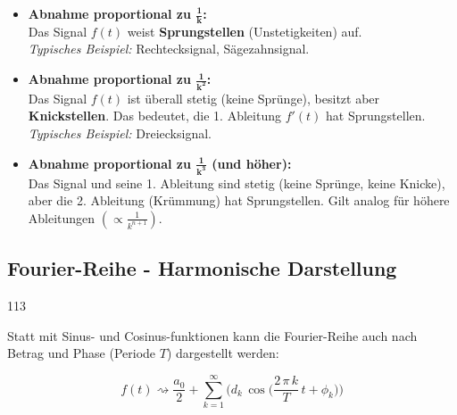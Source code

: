 \begin{itemize}
    \item \textbf{Abnahme proportional zu $\bm{\frac{1}{k}}$:} \\
    Das Signal $f(t)$ weist \textbf{Sprungstellen} (Unstetigkeiten) auf. \\
    \textit{Typisches Beispiel:} Rechtecksignal, Sägezahnsignal.
    
    \item \textbf{Abnahme proportional zu $\bm{\frac{1}{k^2}}$:} \\
    Das Signal $f(t)$ ist überall stetig (keine Sprünge), besitzt aber \textbf{Knickstellen}. Das bedeutet, die 1. Ableitung $f'(t)$ hat Sprungstellen. \\
    \textit{Typisches Beispiel:} Dreiecksignal.
    
    \item \textbf{Abnahme proportional zu $\bm{\frac{1}{k^3}}$ (und höher):} \\
    Das Signal und seine 1. Ableitung sind stetig (keine Sprünge, keine Knicke), aber die 2. Ableitung (Krümmung) hat Sprungstellen. Gilt analog für höhere Ableitungen $\left(\propto \frac{1}{k^{n+1}}\right)$.
\end{itemize}

\vspace{0.3cm}
\textbf{}

\subsection{Fourier-Reihe - Harmonische Darstellung}{113}

Statt mit Sinus- und Cosinus-funktionen kann die Fourier-Reihe auch nach Betrag und Phase (Periode $T$) dargestellt werden:

$$  \boxed{ f(t) \rightsquigarrow \frac{a_0}{2} + \sum\limits_{k=1}^\infty \Big( d_k\, \cos \big(\frac{2 \, \pi \, k}{T} \, t + \phi_k \big) \Big) } $$

